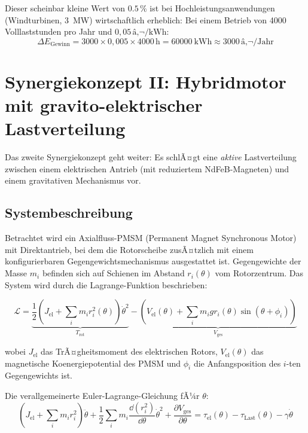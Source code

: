 ﻿\documentclass[12pt, a4paper]{report}
\theoremstyle{definition}
\theoremstyle{remark}
\begin{document}
Dieser scheinbar kleine Wert von $0.5\,\%$ ist bei Hochleistungsanwendungen
(Windturbinen, \SI{3}{\mega\watt}) wirtschaftlich erheblich: Bei einem Betrieb
von 4000 Volllaststunden pro Jahr und $0{,}05\,\text{â‚¬}/\si{\kilo\watt\hour}$:
\begin{equation}
  \Delta E_{\text{Gewinn}} = 3000 \times 0{,}005 \times 4000\,\text{h} = \SI{60000}{\kilo\watt\hour}
  \approx 3000\,\text{â‚¬/Jahr}
\end{equation}

\section{Synergiekonzept II: Hybridmotor mit gravito-elektrischer Lastverteilung}
\label{ssec:synergie2}

Das zweite Synergiekonzept geht weiter: Es schlÃ¤gt eine \emph{aktive} Lastverteilung
zwischen einem elektrischen Antrieb (mit reduziertem NdFeB-Magneten) und einem
gravitativen Mechanismus vor.

\subsection{Systembeschreibung}

Betrachtet wird ein Axialfluss-PMSM (Permanent Magnet Synchronous Motor) mit
Direktantrieb, bei dem die Rotorscheibe zusÃ¤tzlich mit einem konfigurierbaren
Gegengewichtsmechanismus ausgestattet ist. Gegengewichte der Masse $m_i$ befinden
sich auf Schienen im Abstand $r_i(\theta)$ vom Rotorzentrum. Das System wird durch
die Lagrange-Funktion beschrieben:

\begin{equation}
  \mathcal{L} = \underbrace{\frac{1}{2}\left(J_{\text{el}} + \sum_i m_i r_i^2(\theta)\right)
                            \dot\theta^2}_{T_{\text{rot}}}
              - \underbrace{\left(V_{\text{el}}(\theta) + \sum_i m_i g r_i(\theta)
                            \sin(\theta+\phi_i)\right)}_{V_{\text{ges}}}
  \label{eq:lagrange_hybrid}
\end{equation}

wobei $J_{\text{el}}$ das TrÃ¤gheitsmoment des elektrischen Rotors,
$V_{\text{el}}(\theta)$ das magnetische Koenergiepotential des PMSM und
$\phi_i$ die Anfangsposition des $i$-ten Gegengewichts ist.

Die verallgemeinerte Euler-Lagrange-Gleichung fÃ¼r $\theta$:
\begin{equation}
  \left(J_{\text{el}} + \sum_i m_i r_i^2\right)\ddot\theta
  + \frac{1}{2}\sum_i m_i \frac{\dd(r_i^2)}{\dd\theta}\dot\theta^2
  + \frac{\partial V_{\text{ges}}}{\partial\theta}
  = \tau_{\text{el}}(\theta) - \tau_{\text{Last}}(\theta) - \gamma\dot\theta
  \label{eq:euler_lagrange_hybrid}
\end{equation}
\end{document}
